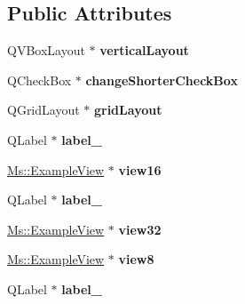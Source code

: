 \subsection*{Public Attributes}
\begin{DoxyCompactItemize}
\item 
\mbox{\label{class_ui___note_groups_a7ba267805b2ba57977c8c3296b48a434}} 
Q\+V\+Box\+Layout $\ast$ {\bfseries vertical\+Layout}
\item 
\mbox{\label{class_ui___note_groups_a3e6afa6c38fdea0f99513a2fc607ab3d}} 
Q\+Check\+Box $\ast$ {\bfseries change\+Shorter\+Check\+Box}
\item 
\mbox{\label{class_ui___note_groups_a11d33e9f43dfb74bc9fc4eb07ee110f0}} 
Q\+Grid\+Layout $\ast$ {\bfseries grid\+Layout}
\item 
\mbox{\label{class_ui___note_groups_a44ffe0d82f76399b8ee41ffcbe0b37cf}} 
Q\+Label $\ast$ {\bfseries label\+\_}
\item 
\mbox{\label{class_ui___note_groups_a1ed89cd7e43bd93e798022b74c9da333}} 
\hyperlink{class_ms_1_1_example_view}{Ms\+::\+Example\+View} $\ast$ {\bfseries view16}
\item 
\mbox{\label{class_ui___note_groups_a5a6ca4a615e4b115c4be2932a35fac3b}} 
Q\+Label $\ast$ {\bfseries label\+\_}
\item 
\mbox{\label{class_ui___note_groups_a725b50d5d9f89978c6e51b046b1d218a}} 
\hyperlink{class_ms_1_1_example_view}{Ms\+::\+Example\+View} $\ast$ {\bfseries view32}
\item 
\mbox{\label{class_ui___note_groups_a98194ab3f5874bc3d1788f915db84921}} 
\hyperlink{class_ms_1_1_example_view}{Ms\+::\+Example\+View} $\ast$ {\bfseries view8}
\item 
\mbox{\label{class_ui___note_groups_ac66d98de8886f2acd20240f408b41c07}} 
Q\+Label $\ast$ {\bfseries label\+\_}
\item 
\mbox{\label{class_ui___note_groups_a576d028c1a16644549dcc32aeafe5221}} 

\end{DoxyCompactItemize}
